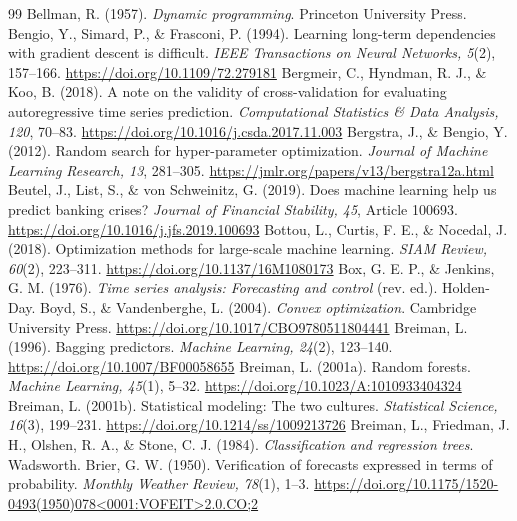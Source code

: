 \begin{thebibliography}{99}
 Bellman, R. (1957). \textit{Dynamic programming}. Princeton University Press.%
 Bengio, Y., Simard, P., \& Frasconi, P. (1994). Learning long-term dependencies with gradient descent is difficult. \textit{IEEE Transactions on Neural Networks, 5}(2), 157--166. \url{https://doi.org/10.1109/72.279181}
 Bergmeir, C., Hyndman, R. J., \& Koo, B. (2018). A note on the validity of cross-validation for evaluating autoregressive time series prediction. \textit{Computational Statistics \& Data Analysis, 120}, 70--83. \url{https://doi.org/10.1016/j.csda.2017.11.003}
 Bergstra, J., \& Bengio, Y. (2012). Random search for hyper-parameter optimization. \textit{Journal of Machine Learning Research, 13}, 281--305. \url{https://jmlr.org/papers/v13/bergstra12a.html}
 Beutel, J., List, S., \& von Schweinitz, G. (2019). Does machine learning help us predict banking crises? \textit{Journal of Financial Stability, 45}, Article 100693. \url{https://doi.org/10.1016/j.jfs.2019.100693}
 Bottou, L., Curtis, F. E., \& Nocedal, J. (2018). Optimization methods for large-scale machine learning. \textit{SIAM Review, 60}(2), 223--311. \url{https://doi.org/10.1137/16M1080173}
 Box, G. E. P., \& Jenkins, G. M. (1976). \textit{Time series analysis: Forecasting and control} (rev. ed.). Holden-Day.%
 Boyd, S., \& Vandenberghe, L. (2004). \textit{Convex optimization}. Cambridge University Press. \url{https://doi.org/10.1017/CBO9780511804441}
 Breiman, L. (1996). Bagging predictors. \textit{Machine Learning, 24}(2), 123--140. \url{https://doi.org/10.1007/BF00058655}
 Breiman, L. (2001a). Random forests. \textit{Machine Learning, 45}(1), 5--32. \url{https://doi.org/10.1023/A:1010933404324}
 Breiman, L. (2001b). Statistical modeling: The two cultures. \textit{Statistical Science, 16}(3), 199--231. \url{https://doi.org/10.1214/ss/1009213726}
 Breiman, L., Friedman, J. H., Olshen, R. A., \& Stone, C. J. (1984). \textit{Classification and regression trees}. Wadsworth.%
 Brier, G. W. (1950). Verification of forecasts expressed in terms of probability. \textit{Monthly Weather Review, 78}(1), 1--3. \url{https://doi.org/10.1175/1520-0493(1950)078<0001:VOFEIT>2.0.CO;2}

\end{thebibliography}
